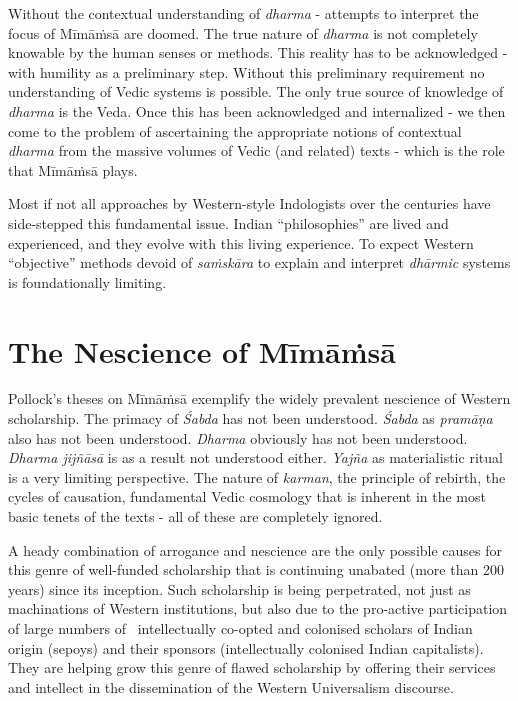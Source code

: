 Without the contextual understanding of \textit{dharma }- attempts to interpret the focus of Mīmāṁsā are doomed. The true nature of \textit{dharma} is not completely knowable by the human senses or methods. This reality has to be acknowledged - with humility as a preliminary step. Without this preliminary requirement no understanding of Vedic systems is possible. The only true source of knowledge of \textit{dharma} is the Veda. Once this has been acknowledged and internalized - we then come to the problem of ascertaining the appropriate notions of contextual \textit{dharma} from the massive volumes of Vedic (and related) texts - which is the role that Mīmāṁsā plays.

Most if not all approaches by Western-style Indologists over the centuries have side-stepped this fundamental issue. Indian “philosophies” are lived and experienced, and they evolve with this living experience. To expect Western “objective” methods devoid of \textit{saṁskāra} to explain and interpret \textit{dhārmic} systems is foundationally limiting.

\section*{The Nescience of Mīmāṁsā}

Pollock’s theses on Mīmāṁsā exemplify the widely prevalent nescience of Western scholarship. The primacy of \textit{Śabda} has not been understood. \textit{Śabda} as \textit{pramāṇa} also has not been understood. \textit{Dharma} obviously has not been understood. \textit{Dharma jijñāsā} is as a result not understood either. \textit{Yajña} as materialistic ritual is a very limiting perspective. The nature of \textit{karman}, the principle of rebirth, the cycles of causation, fundamental Vedic cosmology that is inherent in the most basic tenets of the texts - all of these are completely ignored.

A heady combination of arrogance and nescience are the only possible causes for this genre of well-funded scholarship that is continuing unabated (more than 200 years) since its inception. Such scholarship is being perpetrated, not just as machinations of Western institutions, but also due to the pro-active participation of large numbers of  intellectually co-opted and colonised scholars of Indian origin (sepoys) and their sponsors (intellectually colonised Indian capitalists). They are helping grow this genre of flawed scholarship by offering their services and intellect in the dissemination of the Western Universalism discourse.

